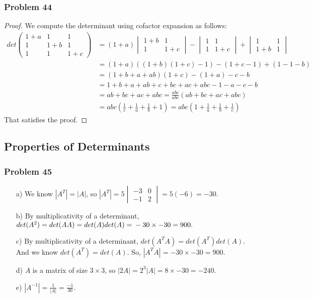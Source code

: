 \documentclass[a4paper,12pt]{article}
\begin{document}
\subsubsection*{Problem 44}
\begin{proof}
    We compute the determinant using cofactor expansion as follows:
    \begin{align*}
        det\begin{pmatrix}
            1+a & 1 & 1\\
            1 & 1+b & 1\\
            1 & 1 & 1+c
        \end{pmatrix} &= (1+a) \begin{vmatrix}
            1+b& 1\\
            1 & 1+c
        \end{vmatrix} - \begin{vmatrix}
            1&1\\
            1&1+c
        \end{vmatrix} + \begin{vmatrix}
            1&1\\
            1+b&1
        \end{vmatrix}\\
        &= (1+a)((1+b)(1+c)-1)-(1+c-1)+(1-1-b)\\
        &=(1+b+a+ab)(1+c)-(1+a)-c-b\\
        &=1+b+a+ab+c+bc+ac+abc-1-a-c-b\\
        &=ab+bc+ac+abc = \frac{abc}{abc}(ab+bc+ac+abc)\\
        &=abc(\frac{1}{c}+\frac{1}{a}+\frac{1}{b}+1) =abc(1+\frac{1}{a}+\frac{1}{b}+\frac{1}{c})
    \end{align*}
That satisfies the proof.
\end{proof}
\subsection{Properties of Determinants}
\subsubsection*{Problem 45}
\begin{itemize}
    \item [a)] We know $|A^T|=|A|$, so $|A^T|= 5\begin{vmatrix}
        -3&0\\
        -1&2
    \end{vmatrix} = 5(-6)=-30.$
    \item [b)] By multiplicativity of a determinant, $det(A^2)=det(AA)=det(A)det(A)=\\-30\times-30=900.$
    \item [c)] By multiplicativity of a determinant, $det(A^TA)=det(A^T)det(A)$. And we know $det(A^T)=det(A)$. So, $|A^TA|=-30\times-30=900.$
    \item [d)] $A$ is a matrix of size $3\times3$, so $|2A|=2^3|A|=8\times -30=-240.$
    \item [e)]  $|A^{-1}|=\frac{1}{|A|}=\frac{-1}{30}.$
\end{itemize}
\end{document}
